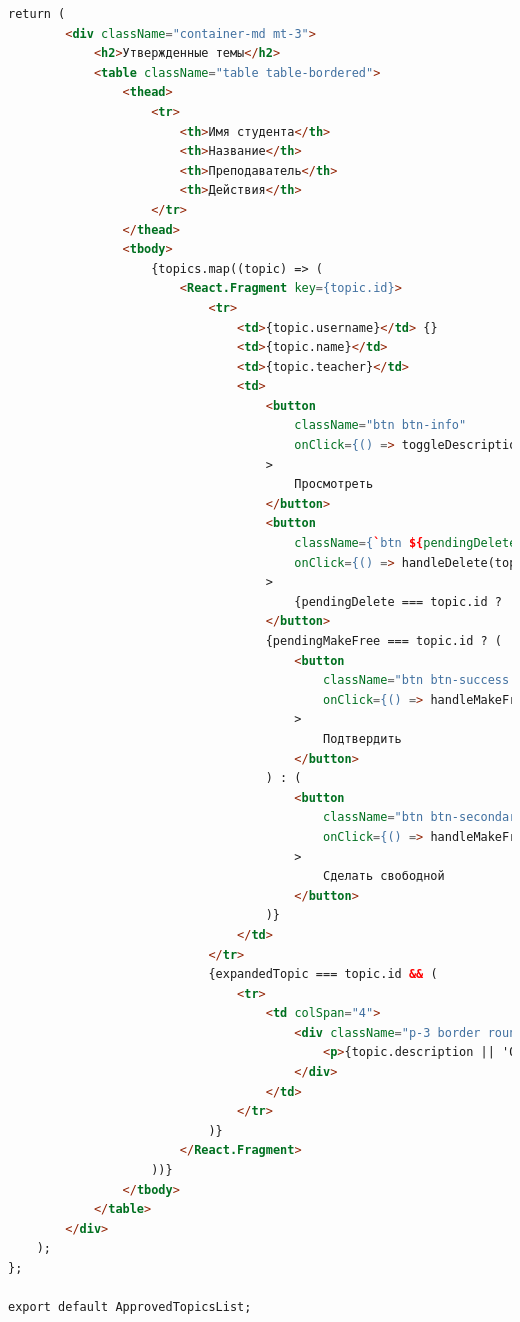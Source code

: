 \documentclass[14pt]{extarticle} %
\begin{document}
\begin{lstlisting}[language=html, caption={Клиентская часть ApprovedTopicsList}]
    return (
        <div className="container-md mt-3">
            <h2>Утвержденные темы</h2>
            <table className="table table-bordered">
                <thead>
                    <tr>
                        <th>Имя студента</th>
                        <th>Название</th>
                        <th>Преподаватель</th>
                        <th>Действия</th>
                    </tr>
                </thead>
                <tbody>
                    {topics.map((topic) => (
                        <React.Fragment key={topic.id}>
                            <tr>
                                <td>{topic.username}</td> {}
                                <td>{topic.name}</td>
                                <td>{topic.teacher}</td>
                                <td>
                                    <button 
                                        className="btn btn-info" 
                                        onClick={() => toggleDescription(topic.id)}
                                    >
                                        Просмотреть
                                    </button>
                                    <button 
                                        className={`btn ${pendingDelete === topic.id ? 'btn-warning' : 'btn-danger'} ms-2`} 
                                        onClick={() => handleDelete(topic.id)}
                                    >
                                        {pendingDelete === topic.id ? 'Подтвердить удаление' : 'Удалить'}
                                    </button>
                                    {pendingMakeFree === topic.id ? (
                                        <button 
                                            className="btn btn-success ms-2"
                                            onClick={() => handleMakeFree(topic.id)}
                                        >
                                            Подтвердить
                                        </button>
                                    ) : (
                                        <button 
                                            className="btn btn-secondary ms-2" 
                                            onClick={() => handleMakeFree(topic.id)}
                                        >
                                            Сделать свободной
                                        </button>
                                    )}
                                </td>
                            </tr>
                            {expandedTopic === topic.id && (
                                <tr>
                                    <td colSpan="4">
                                        <div className="p-3 border rounded">
                                            <p>{topic.description || 'Описание отсутствует.'}</p>
                                        </div>
                                    </td>
                                </tr>
                            )}
                        </React.Fragment>
                    ))}
                </tbody>
            </table>
        </div>
    );
};

export default ApprovedTopicsList;
\end{lstlisting}
\end{document}
